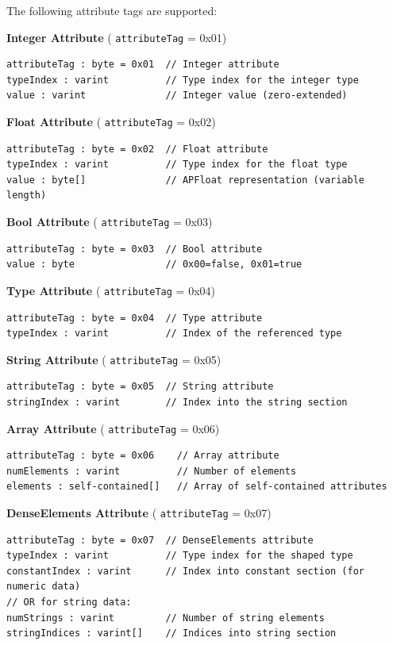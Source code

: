 \documentclass{article}
\begin{document}
The following attribute tags are supported:


\textbf{Integer Attribute} ( \texttt{attributeTag} = 0x01)


\begin{lstlisting}
attributeTag : byte = 0x01  // Integer attribute
typeIndex : varint          // Type index for the integer type
value : varint              // Integer value (zero-extended)
\end{lstlisting}

\textbf{Float Attribute} ( \texttt{attributeTag} = 0x02)


\begin{lstlisting}
attributeTag : byte = 0x02  // Float attribute
typeIndex : varint          // Type index for the float type
value : byte[]              // APFloat representation (variable length)
\end{lstlisting}

\textbf{Bool Attribute} ( \texttt{attributeTag} = 0x03)


\begin{lstlisting}
attributeTag : byte = 0x03  // Bool attribute
value : byte                // 0x00=false, 0x01=true
\end{lstlisting}

\textbf{Type Attribute} ( \texttt{attributeTag} = 0x04)


\begin{lstlisting}
attributeTag : byte = 0x04  // Type attribute
typeIndex : varint          // Index of the referenced type
\end{lstlisting}

\textbf{String Attribute} ( \texttt{attributeTag} = 0x05)


\begin{lstlisting}
attributeTag : byte = 0x05  // String attribute
stringIndex : varint        // Index into the string section
\end{lstlisting}

\textbf{Array Attribute} ( \texttt{attributeTag} = 0x06)


\begin{lstlisting}
attributeTag : byte = 0x06    // Array attribute
numElements : varint          // Number of elements
elements : self-contained[]   // Array of self-contained attributes
\end{lstlisting}

\textbf{DenseElements Attribute} ( \texttt{attributeTag} = 0x07)


\begin{lstlisting}
attributeTag : byte = 0x07  // DenseElements attribute
typeIndex : varint          // Type index for the shaped type
constantIndex : varint      // Index into constant section (for numeric data)
// OR for string data:
numStrings : varint         // Number of string elements
stringIndices : varint[]    // Indices into string section
\end{lstlisting}
\end{document}
